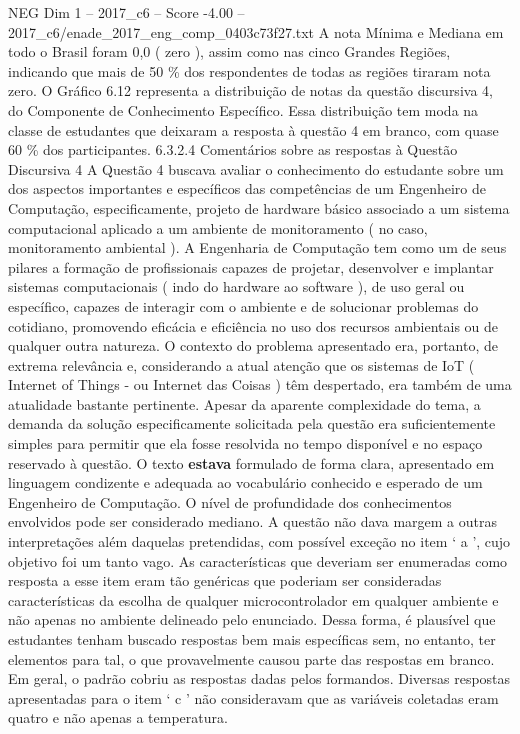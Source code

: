 \begin{textsample}{NEG Dim 1 – 2017\_c6 – Score -4.00 – 2017\_c6/enade\_2017\_eng\_comp\_0403c73f27.txt}
A nota Mínima e Mediana em todo o Brasil foram 0,0 ( zero ), assim como nas cinco Grandes Regiões, indicando que mais de 50 \% dos respondentes de todas as regiões tiraram nota zero.
O Gráfico 6.12 representa a distribuição de notas da questão discursiva 4, do Componente de Conhecimento Específico.
Essa distribuição tem moda na classe de estudantes que deixaram a resposta à questão 4 em branco, com quase 60 \% dos participantes. 6.3.2.4 Comentários sobre as respostas à Questão Discursiva 4 A Questão 4 buscava avaliar o conhecimento do estudante sobre um dos aspectos importantes e específicos das competências de um Engenheiro de Computação, especificamente, projeto de hardware básico associado a um sistema computacional aplicado a um ambiente de monitoramento ( no caso, monitoramento ambiental ).
A Engenharia de Computação tem como um de seus pilares a formação de profissionais capazes de projetar, desenvolver e implantar sistemas computacionais ( indo do hardware ao software ), de uso geral ou específico, capazes de interagir com o ambiente e de solucionar problemas do cotidiano, promovendo eficácia e eficiência no uso dos recursos ambientais ou de qualquer outra natureza.
O contexto do problema apresentado era, portanto, de extrema relevância e, considerando a atual atenção que os sistemas de IoT ( Internet of Things - ou Internet das Coisas ) têm despertado, era também de uma atualidade bastante pertinente.
Apesar da aparente complexidade do tema, a demanda da solução especificamente solicitada pela questão era suficientemente simples para permitir que ela fosse resolvida no tempo disponível e no espaço reservado à questão.
O texto \textbf{estava} formulado de forma clara, apresentado em linguagem condizente e adequada ao vocabulário conhecido e esperado de um Engenheiro de Computação.
O nível de profundidade dos conhecimentos envolvidos pode ser considerado mediano.
A questão não dava margem a outras interpretações além daquelas pretendidas, com possível exceção no item ‘ a ’, cujo objetivo foi um tanto vago.
As características que deveriam ser enumeradas como resposta a esse item eram tão genéricas que poderiam ser consideradas características da escolha de qualquer microcontrolador em qualquer ambiente e não apenas no ambiente delineado pelo enunciado.
Dessa forma, é plausível que estudantes tenham buscado respostas bem mais específicas sem, no entanto, ter elementos para tal, o que provavelmente causou parte das respostas em branco.
Em geral, o padrão cobriu as respostas dadas pelos formandos.
Diversas respostas apresentadas para o item ‘ c ’ não consideravam que as variáveis coletadas eram quatro e não apenas a temperatura.

\end{textsample}
